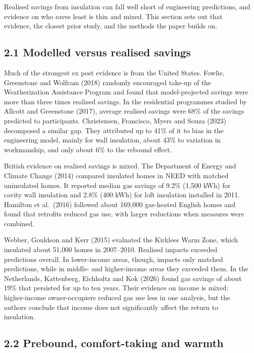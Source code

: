 \documentclass[11pt,a4paper]{article}
\begin{document}
Realised savings from insulation can fall well short of engineering predictions, and evidence on who saves least is thin and mixed. This section sets out that evidence, the closest prior study, and the methods the paper builds on.

\subsection*{2.1 Modelled versus realised savings}

Much of the strongest ex post evidence is from the United States. Fowlie, Greenstone and Wolfram (2018) randomly encouraged take-up of the Weatherization Assistance Program and found that model-projected savings were more than three times realised savings. In the residential programmes studied by Allcott and Greenstone (2017), average realised savings were 68\% of the savings predicted to participants. Christensen, Francisco, Myers and Souza (2023) decomposed a similar gap. They attributed up to 41\% of it to bias in the engineering model, mainly for wall insulation, about 43\% to variation in workmanship, and only about 6\% to the rebound effect.

British evidence on realised savings is mixed. The Department of Energy and Climate Change (2014) compared insulated homes in NEED with matched uninsulated homes. It reported median gas savings of 9.2\% (1,500 kWh) for cavity wall insulation and 2.8\% (400 kWh) for loft insulation installed in 2011. Hamilton et al.~(2016) followed about 169,000 gas-heated English homes and found that retrofits reduced gas use, with larger reductions when measures were combined.

Webber, Gouldson and Kerr (2015) evaluated the Kirklees Warm Zone, which insulated about 51,000 homes in 2007--2010. Realised impacts exceeded predictions overall. In lower-income areas, though, impacts only matched predictions, while in middle- and higher-income areas they exceeded them. In the Netherlands, Kattenberg, Eichholtz and Kok (2026) found gas savings of about 19\% that persisted for up to ten years. Their evidence on income is mixed: higher-income owner-occupiers reduced gas use less in one analysis, but the authors conclude that income does not significantly affect the return to insulation.

\subsection*{2.2 Prebound, comfort-taking and warmth}
\end{document}
